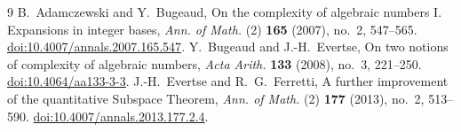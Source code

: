 \documentclass[11pt]{article}
\numberwithin{equation}{section}
\theoremstyle{remark}\newtheorem{remark}[theorem]{Remark}
\begin{document}
\begin{thebibliography}{9}
 B.~Adamczewski and Y.~Bugeaud,
On the complexity of algebraic numbers I. Expansions in integer bases,
\emph{Ann. of Math.} (2) \textbf{165} (2007), no.~2, 547--565.
\href{https://doi.org/10.4007/annals.2007.165.547}{doi:10.4007/annals.2007.165.547}.
 Y.~Bugeaud and J.-H.~Evertse,
On two notions of complexity of algebraic numbers,
\emph{Acta Arith.} \textbf{133} (2008), no.~3, 221--250.
\href{https://doi.org/10.4064/aa133-3-3}{doi:10.4064/aa133-3-3}.
 J.-H.~Evertse and R.~G.~Ferretti,
A further improvement of the quantitative Subspace Theorem,
\emph{Ann. of Math.} (2) \textbf{177} (2013), no.~2, 513--590.
\href{https://doi.org/10.4007/annals.2013.177.2.4}{doi:10.4007/annals.2013.177.2.4}.
\end{thebibliography}
\end{document}
